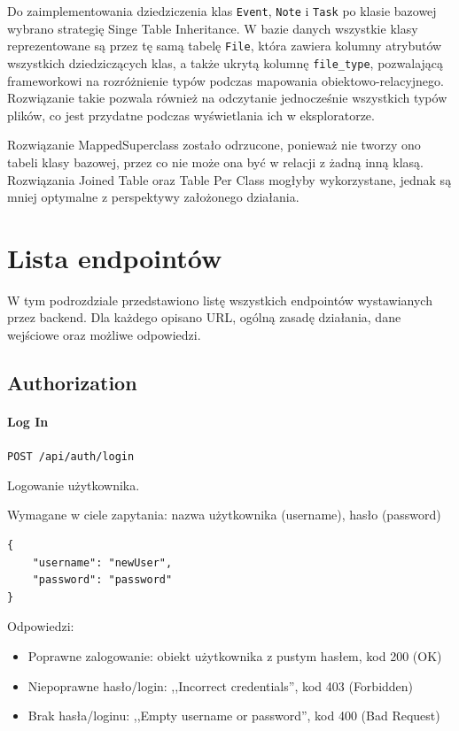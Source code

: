 \documentclass[a4paper,twoside,12pt]{book}
\begin{document}
Do zaimplementowania dziedziczenia klas \texttt{Event}, \texttt{Note} i \texttt{Task} po klasie bazowej wybrano strategię Singe Table Inheritance. W bazie danych wszystkie klasy reprezentowane są przez tę samą tabelę \texttt{File}, która zawiera kolumny atrybutów wszystkich dziedziczących klas, a także ukrytą kolumnę \texttt{file_type}, pozwalającą frameworkowi na rozróżnienie typów podczas mapowania obiektowo-relacyjnego. Rozwiązanie takie pozwala również na odczytanie jednocześnie wszystkich typów plików, co jest przydatne podczas wyświetlania ich w eksploratorze.

Rozwiązanie MappedSuperclass zostało odrzucone, ponieważ nie tworzy ono tabeli klasy bazowej, przez co nie może ona być w relacji z żadną inną klasą. Rozwiązania Joined Table oraz Table Per Class mogłyby wykorzystane, jednak są mniej optymalne z perspektywy założonego działania.

\section{Lista endpointów}

W tym podrozdziale przedstawiono listę wszystkich endpointów wystawianych przez backend. Dla każdego opisano URL, ogólną zasadę działania, dane wejściowe oraz możliwe odpowiedzi.

\subsection{Authorization}\label{authorization}

\paragraph{Log In}\label{log-in}

\texttt{POST /api/auth/login}

Logowanie użytkownika.

Wymagane w ciele zapytania: nazwa użytkownika (username), hasło
(password)

\begin{verbatim}
{
    "username": "newUser",
    "password": "password"
}
\end{verbatim}

Odpowiedzi: 
\begin{itemize}
	\item Poprawne zalogowanie: obiekt użytkownika z pustym hasłem, kod 200 (OK) 
	\item Niepoprawne hasło/login: ,,Incorrect credentials'', kod 403 (Forbidden) 
	\item Brak hasła/loginu: ,,Empty username or password'', kod 400 (Bad Request) 
\end{itemize}
\end{document}
